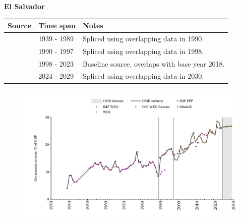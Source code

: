\documentclass[12pt,a4paper,landscape]{article}
\begin{document}
\begin{adjustbox}{max totalsize={\paperwidth}{\paperheight},center}
\begin{minipage}[t][\textheight][t]{\textwidth}
\vspace*{0.5cm}
{}
\begin{center}
{\Large\bfseries El Salvador}
\end{center}
\vspace{0.5cm}
\begin{table}[H]
\centering
\small
\begin{tabular}{|l|l|l|}
\hline
\textbf{Source} & \textbf{Time span} & \textbf{Notes} \\
\hline
\rowcolor{white}\cite{Mitchell}& 1939 - 1989 &Spliced using overlapping data in 1990.\\
\rowcolor{lightgray}\cite{IMF_WEO}& 1990 - 1997 &Spliced using overlapping data in 1998.\\
\rowcolor{white}\cite{WDI}& 1998 - 2023 &Baseline source, overlaps with base year 2018.\\
\rowcolor{lightgray}\cite{IMF_WEO_forecast}& 2024 - 2029 &Spliced using overlapping data in 2030.\\
\hline
\end{tabular}
\end{table}
\begin{figure}[H]
\centering
\includegraphics[width=\textwidth,height=0.6\textheight,keepaspectratio]{graphs/SLV_govrev_GDP.pdf}
\end{figure}
\end{minipage}
\end{adjustbox}
\end{document}
